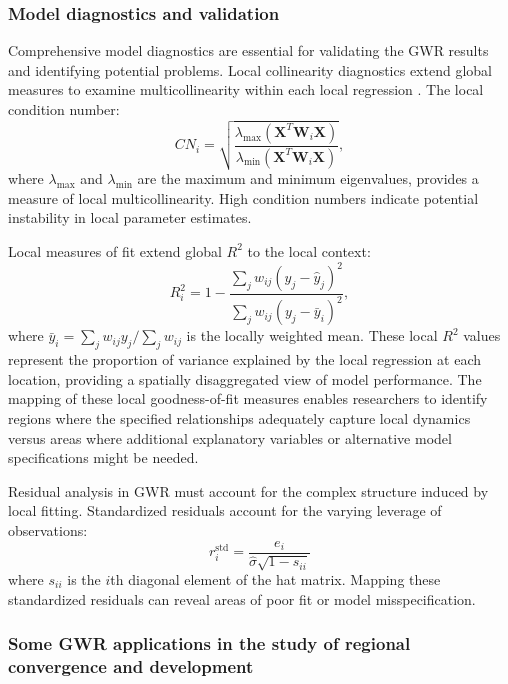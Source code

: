 \documentclass[smallextended, natbib]{svjour3}       %
\begin{document}
\subsubsection*{Model diagnostics and validation}

Comprehensive model diagnostics are essential for validating the GWR results and identifying potential problems. 
Local collinearity diagnostics extend global measures to examine multicollinearity within each local regression \citep{wheeler2005multicollinearity}. 
The local condition number:
$$CN_i = \sqrt{\frac{\lambda_{\max}(\mathbf{X}^T\mathbf{W}_i\mathbf{X})}{\lambda_{\min}(\mathbf{X}^T\mathbf{W}_i\mathbf{X})}},$$
where $\lambda_{\max}$ and $\lambda_{\min}$ are the maximum and minimum eigenvalues, provides a measure of local multicollinearity. 
High condition numbers indicate potential instability in local parameter estimates.


Local measures of fit extend global $R^2$ to the local context:
$$R_i^2 = 1 - \frac{\sum_j w_{ij}(y_j - \hat{y}_j)^2}{\sum_j w_{ij}(y_j - \bar{y}_i)^2},$$
where $\bar{y}_i = \sum_j w_{ij}y_j / \sum_j w_{ij}$ is the locally weighted mean. 
These local $R^2$ values represent the proportion of variance explained by the local regression at each location, providing a spatially disaggregated view of model performance.  
The mapping of these local goodness-of-fit measures enables researchers to identify regions where the specified relationships adequately capture local dynamics versus areas where additional explanatory variables or alternative model specifications might be needed. 

Residual analysis in GWR must account for the complex structure induced by local fitting. 
Standardized residuals account for the varying leverage of observations:
$$r_i^{\text{std}} = \frac{e_i}{\hat{\sigma}\sqrt{1 - s_{ii}}}$$
where $s_{ii}$ is the $i$th diagonal element of the hat matrix. 
Mapping these standardized residuals can reveal areas of poor fit or model misspecification.



\subsubsection*{Some GWR applications in the study of regional convergence and development}
\end{document}
